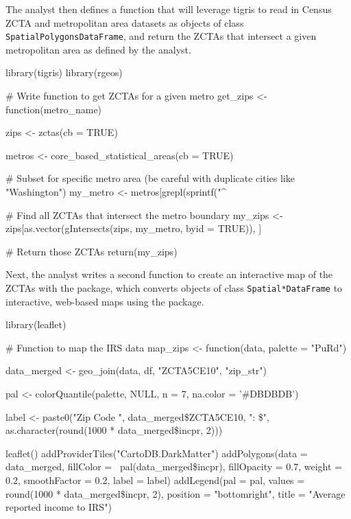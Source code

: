 The analyst then defines a function that will leverage tigris to read in
Census ZCTA and metropolitan area datasets as objects of class
\texttt{SpatialPolygonsDataFrame}, and return the ZCTAs that intersect a
given metropolitan area as defined by the analyst.

\begin{Schunk}
\begin{Sinput}
library(tigris)
library(rgeos)

# Write function to get ZCTAs for a given metro
get_zips <- function(metro_name) {
  
  zips <- zctas(cb = TRUE)
  
  metros <- core_based_statistical_areas(cb = TRUE)
  
  # Subset for specific metro area (be careful with duplicate cities like "Washington")
  my_metro <- metros[grepl(sprintf("\^%
  
  # Find all ZCTAs that intersect the metro boundary
  my_zips <- zips[as.vector(gIntersects(zips, my_metro, byid = TRUE)), ]
  
  # Return those ZCTAs
  return(my_zips)

}
\end{Sinput}
\end{Schunk}

Next, the analyst writes a second function to create an interactive map
of the ZCTAs with the  package, which converts objects
of class \texttt{Spatial*DataFrame} to interactive, web-based maps using
the  package.

\begin{Schunk}
\begin{Sinput}
library(leaflet)

# Function to map the IRS data
map_zips <- function(data, palette = "PuRd") {
  
  data_merged <- geo_join(data, df, "ZCTA5CE10", "zip_str")

  pal <- colorQuantile(palette, NULL, n = 7, na.color = '#DBDBDB')
  
  label <- paste0("Zip Code ", data_merged\$ZCTA5CE10, ": \$", 
                  as.character(round(1000 * data_merged\$incpr, 2)))
  
  leaflet() %
    addProviderTiles("CartoDB.DarkMatter") %
    addPolygons(data = data_merged, 
                fillColor = ~pal(data_merged\$incpr), 
                fillOpacity = 0.7, 
                weight = 0.2, 
                smoothFactor = 0.2, 
                label = label) %
    addLegend(pal = pal, 
              values = round(1000 * data_merged\$incpr, 2), 
              position = "bottomright", 
              title = "Average reported income to IRS")

}
\end{Sinput}
\end{Schunk}

